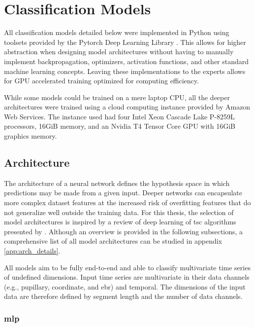 \newpage
\section{Classification Models} \label{sec:impl/clf_models}

All classification models detailed below were implemented in Python using toolsets provided by the Pytorch Deep Learning Library \cite{paszke2019}. This allows for higher abstraction when designing model architectures without having to manually implement backpropagation, optimizers, activation functions, and other standard machine learning concepts. Leaving these implementations to the experts allows for GPU accelerated training optimized for computing efficiency.

While some models could be trained on a mere laptop CPU, all the deeper architectures were trained using a cloud computing instance provided by Amazon Web Services. The instance used had four Intel Xeon Cascade Lake P-8259L processors, 16GiB memory, and an Nvidia T4 Tensor Core GPU with 16GiB graphics memory.

\subsection{Architecture}

The architecture of a neural network defines the hypothesis space in which predictions may be made from a given input. Deeper networks can encapsulate more complex dataset features at the increased risk of overfitting features that do not generalize well outside the training data. For this thesis, the selection of model architectures is inspired by a review of deep learning of \acrshort{tsc} algorithms presented by \textcite{fawaz2018}. Although an overview is provided in the following subsections, a comprehensive list of all model architectures can be studied in appendix \ref{app:arch_details}.

All models aim to be fully end-to-end and able to classify multivariate time series of undefined dimensions. Input time series are multivariate in their data channels (e.g., pupillary, coordinate, and \acrshort{ebr}) and temporal. 
The dimensions of the input data are therefore defined by segment length and the number of data channels.

\newpage
\subsubsection{\acrlong{mlp}}

